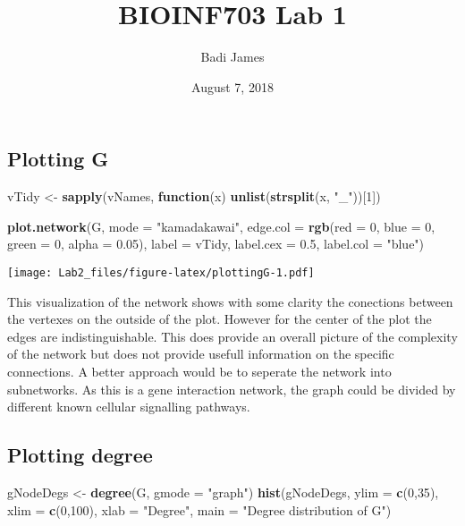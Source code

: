 \documentclass[]{article}
\title{BIOINF703 Lab 1}
\author{Badi James}
\date{August 7, 2018}
\newenvironment{Shaded}{\begin{snugshade}}{\end{snugshade}}
\newcommand{\KeywordTok}[1]{\textcolor[rgb]{0.13,0.29,0.53}{\textbf{#1}}}
\newcommand{\DataTypeTok}[1]{\textcolor[rgb]{0.13,0.29,0.53}{#1}}
\newcommand{\DecValTok}[1]{\textcolor[rgb]{0.00,0.00,0.81}{#1}}
\newcommand{\FloatTok}[1]{\textcolor[rgb]{0.00,0.00,0.81}{#1}}
\newcommand{\StringTok}[1]{\textcolor[rgb]{0.31,0.60,0.02}{#1}}
\newcommand{\ControlFlowTok}[1]{\textcolor[rgb]{0.13,0.29,0.53}{\textbf{#1}}}
\newcommand{\NormalTok}[1]{#1}
\begin{document}
\maketitle

\subsection{Plotting G}\label{plotting-g}

\begin{Shaded}
\begin{Highlighting}[]
\NormalTok{vTidy <-}\StringTok{ }\KeywordTok{sapply}\NormalTok{(vNames, }\ControlFlowTok{function}\NormalTok{(x) }\KeywordTok{unlist}\NormalTok{(}\KeywordTok{strsplit}\NormalTok{(x, }\StringTok{"_"}\NormalTok{))[}\DecValTok{1}\NormalTok{])}

\KeywordTok{plot.network}\NormalTok{(G, }\DataTypeTok{mode =} \StringTok{"kamadakawai"}\NormalTok{, }\DataTypeTok{edge.col =} \KeywordTok{rgb}\NormalTok{(}\DataTypeTok{red =} \DecValTok{0}\NormalTok{, }\DataTypeTok{blue =} \DecValTok{0}\NormalTok{, }\DataTypeTok{green =} \DecValTok{0}\NormalTok{, }\DataTypeTok{alpha =} \FloatTok{0.05}\NormalTok{), }\DataTypeTok{label =}\NormalTok{ vTidy, }\DataTypeTok{label.cex =} \FloatTok{0.5}\NormalTok{, }\DataTypeTok{label.col =} \StringTok{"blue"}\NormalTok{)}
\end{Highlighting}
\end{Shaded}

\texttt{[image: Lab2\_files/figure-latex/plottingG-1.pdf]}

This visualization of the network shows with some clarity the conections
between the vertexes on the outside of the plot. However for the center
of the plot the edges are indistinguishable. This does provide an
overall picture of the complexity of the network but does not provide
usefull information on the specific connections. A better approach would
be to seperate the network into subnetworks. As this is a gene
interaction network, the graph could be divided by different known
cellular signalling pathways.

\subsection{Plotting degree}\label{plotting-degree}

\begin{Shaded}
\begin{Highlighting}[]
\NormalTok{gNodeDegs <-}\StringTok{ }\KeywordTok{degree}\NormalTok{(G, }\DataTypeTok{gmode =} \StringTok{"graph"}\NormalTok{)}
\KeywordTok{hist}\NormalTok{(gNodeDegs, }\DataTypeTok{ylim =} \KeywordTok{c}\NormalTok{(}\DecValTok{0}\NormalTok{,}\DecValTok{35}\NormalTok{), }\DataTypeTok{xlim =} \KeywordTok{c}\NormalTok{(}\DecValTok{0}\NormalTok{,}\DecValTok{100}\NormalTok{), }\DataTypeTok{xlab =} \StringTok{"Degree"}\NormalTok{, }\DataTypeTok{main =} \StringTok{"Degree distribution of G"}\NormalTok{)}
\end{Highlighting}
\end{Shaded}
\end{document}
